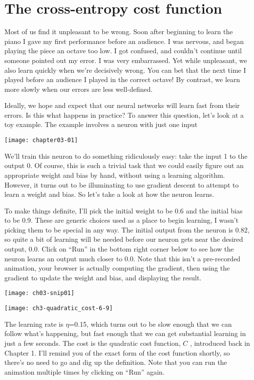 \section{The cross-entropy cost function}
\label{sec:Thecross-entropycostfunction}

Most of us find it unpleasant to be wrong. Soon after beginning to learn the piano I gave my first performance before an audience. I was nervous, and began playing the piece an octave too low. I got confused, and couldn't continue until someone pointed out my error. I was very embarrassed. Yet while unpleasant, we also learn quickly when we're decisively wrong. You can bet that the next time I played before an audience I played in the correct octave! By contrast, we learn more slowly when our errors are less well-defined.

Ideally, we hope and expect that our neural networks will learn fast from their errors. Is this what happens in practice? To answer this question, let's look at a toy example. The example involves a neuron with just one input

\begin{marginfigure}
\texttt{[image: chapter03-01]}
\end{marginfigure}


We'll train this neuron to do something ridiculously easy: take the input 1 to the output 0. Of course, this is such a trivial task that we could easily figure out an appropriate weight and bias by hand, without using a learning algorithm. However, it turns out to be illuminating to use gradient descent to attempt to learn a weight and bias. So let's take a look at how the neuron learns.


To make things definite, I'll pick the initial weight to be 0.6 and the initial bias to be 0.9. These are generic choices used as a place to begin learning, I wasn't picking them to be special in any way. The initial output from the neuron is 0.82, so quite a bit of learning will be needed before our neuron gets near the desired output, 0.0. Click on ``Run'' in the bottom right corner below to see how the neuron learns an output much closer to 0.0. Note that this isn't a pre-recorded animation, your browser is actually computing the gradient, then using the gradient to update the weight and bias, and displaying the result. 
\begin{marginfigure}[-40mm]
\texttt{[image: ch03-snip01]}
\end{marginfigure}
\begin{marginfigure}
\texttt{[image: ch3-quadratic\_cost-6-9]}
\end{marginfigure}
The learning rate is $\eta$=0.15, which turns out to be slow enough that we can follow what's happening, but fast enough that we can get substantial learning in just a few seconds. The cost is the quadratic cost function, $C$ , introduced back in Chapter 1. I'll remind you of the exact form of the cost function shortly, so there's no need to go and dig up the definition. Note that you can run the animation multiple times by clicking on ``Run'' again.

